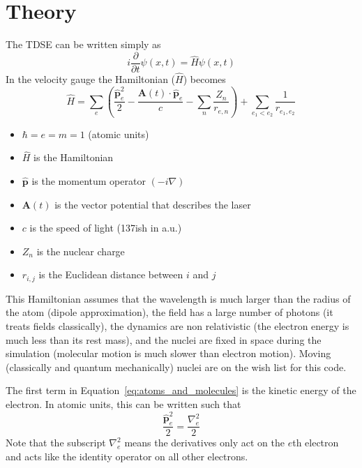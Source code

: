 \documentclass{article}
\begin{document}
\section{Theory} %
\label{sec:theory}

The TDSE can be written simply as
\begin{equation}
    i\frac{\partial}{\partial t}\psi(x,t) = \hat{H}\psi(x,t)
\end{equation}
In the velocity gauge the Hamiltonian ($\hat{H}$) becomes
\begin{equation}
    \label{eq:atoms_and_molecules}
    \hat{H} = \sum_{e}\left(\frac{\hat{\mathbf{p}}^2_e}{2} - \frac{\mathbf{A}(t) \cdot \hat{\mathbf{p}}_e}{c} - \sum_{n} \frac{Z_n}{r_{e,n}}\right) + \sum_{e_1 < e_2}\frac{1}{r_{e_1, e_2}}
\end{equation}
\begin{itemize}
    \item $\hbar=e=m=1$ (atomic units)
    \item $\hat{H}$ is the Hamiltonian
    \item $\hat{\mathbf{p}}$ is the momentum operator $(-i\nabla)$
    \item $\mathbf{A}(t)$ is the vector potential that describes the laser
    \item $c$ is the speed of light (137ish in a.u.)
    \item $Z_n$ is the nuclear charge
    \item $r_{i,j}$ is the Euclidean distance between $i$ and $j$
\end{itemize}
This Hamiltonian assumes that the wavelength is much larger than the radius of the atom (dipole approximation), the field has a large number of photons (it treats fields classically), the dynamics are non relativistic (the electron energy is much less than its rest mass), and the nuclei are fixed in space during the simulation (molecular motion is much slower than electron motion). Moving (classically and quantum mechanically) nuclei are on the wish list for this code.

The first term in Equation~\ref{eq:atoms_and_molecules} is the kinetic energy of the electron. In atomic units, this can be written such that
\begin{equation}
  \frac{\hat{\mathbf{p}}^2_e}{2} = \frac{\nabla_e^2}{2}
\end{equation}
Note that the subscript $\nabla_e^2$ means the derivatives only act on the $e$th electron and acts like the identity operator on all other electrons.
\end{document}

